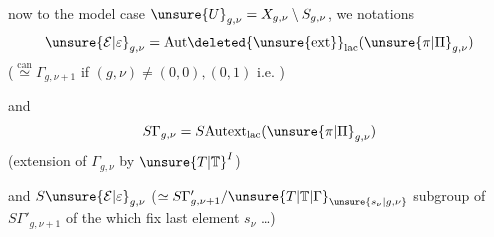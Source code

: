  now to the model case 
$\unsure{U}_{g,\nu}=X_{g,\nu}\setminus S_{g,\nu}$, we   notations
\[
\unsure{\mathcal E|\varepsilon}_{g,\nu}
=\mathrm{Aut}\deleted{\unsure{\mathrm{ext}}}_{\mathrm{lac}}
(\unsure{\pi|\Pi}_{g,\nu})
\]
($\stackrel{\mathrm{can}}{\simeq}\Gamma_{g,\nu+1}$ if $(g,\nu)\ne(0,0),(0,1)$ i.e. ) 

and
\[
S\Gamma_{g,\nu}=S\mathrm{Autext}_{\mathrm{lac}}(\unsure{\pi|\Pi}_{g,\nu})
\]
(extension of $\Gamma_{g,\nu}$ by $\unsure{T|\mathbb T}^I$)

and $S\unsure{\mathcal E|\varepsilon}_{g,\nu}$
($\simeq S\Gamma'_{g,\nu+1}/\unsure{T|\mathbb T|\Gamma}_{\unsure{s_\nu|g,\nu}}$
subgroup of $S\Gamma'_{g,\nu+1}$ of the  which fix  last element $s_\nu$ \ldots)